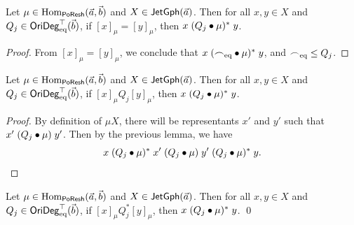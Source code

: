 \documentclass[a4paper]{memoir}
\begin{document}
\begin{lemma} \label{thm:poresh-jetgph-equality-eq-from-trcl}
	Let $\mu \in {\mathrm{Hom}}_{\mathsf{PoResh}}(\vec a, \vec b)$ and $X \in \mathsf{JetGph}(\vec a)$.
	Then for all $x, y \in X$ and $Q_j \in \mathsf{OriDeg}_{\mathrm{eq}}^\top(\vec b)$, if $[x]_\mu = [y]_\mu$, then $x \mathrel{(Q_j \mathbin{\bullet} \mu)^*} y$.
\end{lemma}
\begin{proof}
	From $[x]_\mu = [y]_\mu$, we conclude that $x \mathrel{({\frown}_{{\mathrm{eq}}} \mathbin{\bullet} \mu)^*} y$, and ${\frown}_{{\mathrm{eq}}} \leq Q_j$.
\end{proof}
\begin{lemma} \label{thm:poresh-jetgph-rel-from-trcl}
	Let $\mu \in {\mathrm{Hom}}_{\mathsf{PoResh}}(\vec a, \vec b)$ and $X \in \mathsf{JetGph}(\vec a)$.
	Then for all $x, y \in X$ and $Q_j \in \mathsf{OriDeg}_{\mathrm{eq}}^\top(\vec b)$, if $[x]_\mu \mathrel{Q_j} [y]_\mu$, then $x \mathrel{(Q_j \mathbin{\bullet} \mu)^*} y$.
\end{lemma}
\begin{proof}
	By definition of $\mu X$, there will be representants $x'$ and $y'$ such that $x' \mathrel{(Q_j \mathbin{\bullet} \mu)} y'$.
	Then by the previous lemma, we have
	\[
		x \mathrel{(Q_j \mathbin{\bullet} \mu)^*} x' \mathrel{(Q_j \mathbin{\bullet} \mu)} y' \mathrel{(Q_j \mathbin{\bullet} \mu)^*} y. \qedhere
	\]
\end{proof}
\begin{corollary} \label{thm:poresh-jetgph-trcl-from-trcl}
	Let $\mu \in {\mathrm{Hom}}_{\mathsf{PoResh}}(\vec a, \vec b)$ and $X \in \mathsf{JetGph}(\vec a)$.
	Then for all $x, y \in X$ and $Q_j \in \mathsf{OriDeg}_{\mathrm{eq}}^\top(\vec b)$, if $[x]_\mu \mathrel{Q_j^*} [y]_\mu$, then $x \mathrel{(Q_j \mathbin{\bullet} \mu)^*} y$. \qed
\end{corollary}
\end{document}
